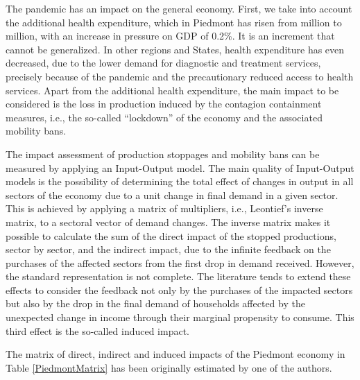 \documentclass[graybox]{svmult}
\begin{document}
The pandemic has an impact on the general economy. First, we take into account the additional health expenditure, which in Piedmont has risen from  million to  million, with an increase in pressure on GDP of 0.2\%. It is an increment that cannot be generalized. In other regions and States, health expenditure has even decreased, due to the lower demand for diagnostic and treatment services, precisely because of the pandemic and the precautionary reduced access to health services. Apart from the additional health expenditure, the main impact to be considered is the loss in production induced by the contagion containment measures, i.e., the so-called ``lockdown'' of the economy and the associated mobility bans. 

The impact assessment of production stoppages and mobility bans can be measured by applying an Input-Output model. The main quality of Input-Output models is the possibility of determining the total effect of changes in output in all sectors of the economy due to a unit change in final demand in a given sector. This is achieved by applying a matrix of multipliers, i.e., Leontief's inverse matrix, to a sectoral vector of demand changes. The inverse matrix makes it possible to calculate the sum of the direct impact of the stopped productions, sector by sector, and the indirect impact, due to the infinite feedback on the purchases of the affected sectors from the first drop in demand received. However, the standard representation is not complete. The literature tends to extend these effects to consider the feedback not only by the purchases of the impacted sectors but also by the drop in the final demand of households affected by the unexpected change in income through their marginal propensity to consume. This third effect is the so-called induced impact.

The matrix of direct, indirect and induced impacts of the Piedmont economy in Table \ref{PiedmontMatrix} has been originally estimated by one of the authors.
\end{document}
